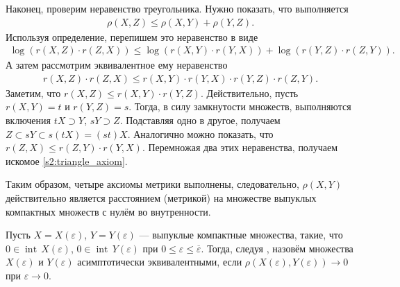 \documentclass[../main.tex]{subfiles}
\begin{document}
Наконец, проверим неравенство треугольника. 
Нужно показать, что выполняется
\begin{gather*}
	\rho(X,Z) \leqslant \rho(X,Y) + \rho(Y,Z).
\end{gather*}
Используя определение, перепишем это неравенство в виде
\begin{gather*}
	\log(r(X,Z) \cdot r(Z,X)) \leqslant \log(r(X,Y) \cdot r(Y,X)) + \log(r(Y,Z) \cdot r(Z,Y)).
\end{gather*}
А затем рассмотрим эквивалентное ему неравенство
\begin{gather}\label{s2:triangle_axiom}
	r(X,Z) \cdot r(Z,X) \leqslant r(X,Y) \cdot r(Y,X) \cdot r(Y,Z) \cdot r(Z,Y).
\end{gather}
Заметим, что $r(X,Z) \leqslant r(X,Y) \cdot r(Y,Z)$.
Действительно, пусть $ r(X,Y) = t $ и $r(Y,Z) = s$.
Тогда, в силу замкнутости множеств, выполняются включения $tX \supset Y$, $sY \supset Z$.
Подставляя одно в другое, получаем $Z \subset sY \subset s(tX) = (st) X$.
Аналогично можно показать, что $r(Z,X) \leqslant r(Z,Y) \cdot r(Y,X)$. 
Перемножая два этих неравенства, получаем искомое \eqref{s2:triangle_axiom}.

Таким образом, четыре аксиомы метрики выполнены, следовательно, $\rho(X,Y)$ действительно является расстоянием (метрикой) на множестве выпуклых компактных множеств с нулём во внутренности.


Пусть $ X = X(\varepsilon) $, $ Y = Y(\varepsilon) $ --- выпуклые компактные множества, такие, что $ 0 \in \operatorname{int}\,X(\varepsilon) $, $ 0 \in \operatorname{int}\,Y(\varepsilon) $ при $0 \leqslant \varepsilon \leqslant \overline{\varepsilon} $.
Тогда, следуя \cite{Ovs}, назовём множества $ X(\varepsilon) $ и $ Y(\varepsilon) $ асимптотически эквивалентными, если $ \rho (X(\varepsilon), Y(\varepsilon)) \rightarrow 0 $ при $\varepsilon \rightarrow 0 $.
\end{document}
